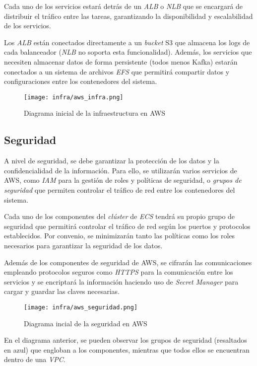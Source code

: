 Cada uno de los servicios estará detrás de un \textit{ALB} o \textit{NLB} que se
encargará de distribuir el tráfico entre las tareas, garantizando la
disponibilidad y escalabilidad de los servicios.

Los \textit{ALB} están conectados directamente a un \textit{bucket} S3 que
almacena los logs de cada balanceador (\textit{NLB} no soporta esta
funcionalidad). Además, los servicios que necesiten almacenar datos de forma
persistente (todos menos Kafka) estarán conectados a un sistema de archivos
\textit{EFS} que permitirá compartir datos y configuraciones entre los
contenedores del sistema.

\begin{figure}[H]
	\centerline{\texttt{[image: infra/aws\_infra.png]}}
	\caption{Diagrama inicial de la infraestructura en AWS}
	\label{fig:aws_infra}
\end{figure}


\newpage{}
\subsection{Seguridad}\label{subsec:seguridad}
A nivel de seguridad, se debe garantizar la protección de los datos y la
confidencialidad de la información. Para ello, se utilizarán varios servicios de
AWS, como \textit{IAM} para la gestión de roles y políticas de seguridad, o
\textit{grupos de seguridad} que permiten controlar el tráfico de red entre los
contenedores del sistema.

Cada uno de los componentes del \textit{clúster} de \textit{ECS} tendrá su
propio grupo de seguridad que permitirá controlar el tráfico de red según los
puertos y protocolos establecidos. Por convenio, se minimizarán tanto las
políticas como los roles necesarios para garantizar la seguridad de los datos.

Además de los componentes de seguridad de AWS, se cifrarán las comunicaciones
empleando protocolos seguros como \textit{HTTPS} para la comunicación entre los
servicios y se encriptará la información haciendo uso de \textit{Secret Manager}
para cargar y guardar las claves necesarias.


\begin{figure}[H]
	\centerline{\texttt{[image: infra/aws\_seguridad.png]}}
	\caption{Diagrama incial de la seguridad en AWS}
	\label{fig:aws_seguridad}
\end{figure}

En el diagrama anterior, se pueden observar los grupos de seguridad (resaltados
en azul) que engloban a los componentes, mientras que todos ellos se encuentran
dentro de una \textit{VPC}.


